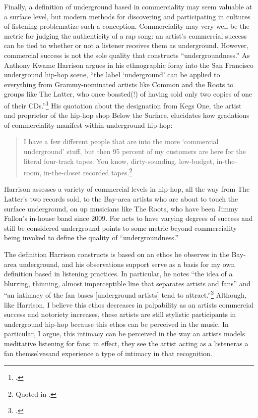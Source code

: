 Finally, a definition of underground based in commerciality may seem valuable at a surface level, but modern
methods for discovering and participating in cultures of listening problematize such a conception. Commerciality
may very well be the metric for judging the authenticity of a rap song: an artist's commercial success can be tied to
whether or not a listener receives them as underground. However, commercial success is not the sole quality that
constructs ``undergroundness.'' As Anthony Kwame Harrison argues in his ethnographic foray into the San Francisco
underground hip-hop scene, ``the label `underground' can be applied to everything from Grammy-nominated artists like
Common and the Roots to groups like The Latter, who once boasted(!) of having sold only two copies of one of their
CDs.''\footnote{
    \autocite[9]{anthonykwameharrisonHipHopUnderground2009}.}
His quotation about the designation from Kegs One, the artist and proprietor of the hip-hop shop Below the Surface, 
elucidates how gradations of commerciality manifest within underground hip-hop:

    \begin{quote}
        I have a few different people that are into the more `commercial underground' stuff, but then 95 percent of my
        customers are here for the  literal four-track tapes. You know, dirty-sounding, low-budget, in-the-room, in-the-closet
        recorded tapes.\footnote{
        Quoted in \autocite[10]{anthonykwameharrisonHipHopUnderground2009}.}
    \end{quote}
Harrison assesses a variety of commercial levels in hip-hop, all the way from The Latter's two records sold, to 
the Bay-area artists who are about to touch the surface underground, on up musicians like The Roots, who have been 
Jimmy Fallon's in-house band since 2009. For acts to have varying degrees of success and still be considered 
underground points to some metric beyond commerciality being invoked to define the quality of ``undergroundness.''

The definition Harrison constructs is based on an ethos he observes in the Bay-area underground, and his observations
support serve as a basis for my own definition based in listening practices. In particular, he notes ``the idea of a
blurring, thinning, almost imperceptible line that separates artists and fans'' and ``an intimacy of the fan bases
[underground artists] tend to attract.''\footnote{
    \autocite[10--11]{anthonykwameharrisonHipHopUnderground2009}.}
Although, like Harrison, I believe this ethos decreases in palpability as an artists commercial success and notoriety
increases, these artists are still stylistic participants in underground hip-hop because this ethos can be perceived
in the music. In particular, I argue, this intimacy can be perceived in the way an artists models meditative listening
for fans; in effect, they see the artist acting as a listener\textemdash as a fan themselves\textemdash and experience
a type of intimacy in that recognition.

